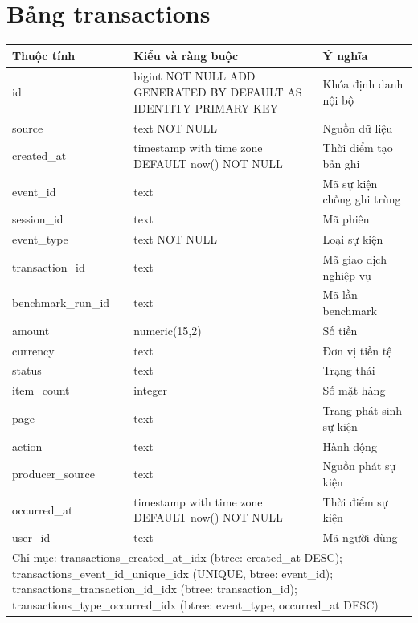 \section{Bảng transactions}
\begin{longtable}{|p{}|p{}|p{}|}\hline
\textbf{Thuộc tính}&\textbf{Kiểu và ràng buộc}&\textbf{Ý nghĩa}\\\hline\endhead
id & bigint NOT NULL ADD GENERATED BY DEFAULT AS IDENTITY PRIMARY KEY & Khóa định danh nội bộ\\\hline
source & text NOT NULL & Nguồn dữ liệu\\\hline
created\_at & timestamp with time zone DEFAULT now() NOT NULL & Thời điểm tạo bản ghi\\\hline
event\_id & text & Mã sự kiện chống ghi trùng\\\hline
session\_id & text & Mã phiên\\\hline
event\_type & text NOT NULL & Loại sự kiện\\\hline
transaction\_id & text & Mã giao dịch nghiệp vụ\\\hline
benchmark\_run\_id & text & Mã lần benchmark\\\hline
amount & numeric(15,2) & Số tiền\\\hline
currency & text & Đơn vị tiền tệ\\\hline
status & text & Trạng thái\\\hline
item\_count & integer & Số mặt hàng\\\hline
page & text & Trang phát sinh sự kiện\\\hline
action & text & Hành động\\\hline
producer\_source & text & Nguồn phát sự kiện\\\hline
occurred\_at & timestamp with time zone DEFAULT now() NOT NULL & Thời điểm sự kiện\\\hline
user\_id & text & Mã người dùng\\\hline
\multicolumn{3}{|p{0.93\textwidth}|}{Chỉ mục: transactions\_created\_at\_idx (btree: created\_at DESC); transactions\_event\_id\_unique\_idx (UNIQUE, btree: event\_id); transactions\_transaction\_id\_idx (btree: transaction\_id); transactions\_type\_occurred\_idx (btree: event\_type, occurred\_at DESC)}\\\hline
\end{longtable}
\normalsize

